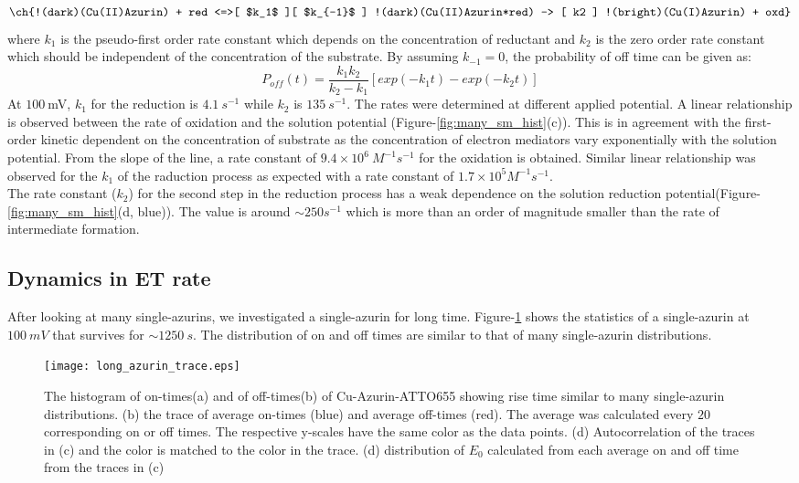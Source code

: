 \begin{align}
	\ch{!(dark)(Cu(II)Azurin) + red <=>[ $k_1$ ][ $k_{-1}$ ] !(dark)(Cu(II)Azurin*red) -> [ k2 ] !(bright)(Cu(I)Azurin) + oxd}
	\label{eq:reduction}
\end{align}
where $k_1$ is the pseudo-first order rate constant which depends on the concentration of reductant and $k_2$ is the zero order rate constant which should be independent of the concentration of the substrate. By assuming $k_{-1}=0$, the probability of off time can be given as:\cite{lu1998single-molecule}
\begin{equation}
	P_{off}(t) = \frac{k_1k_2}{k_2-k_1} [exp(-k_1t)-exp(-k_2t)]
	\label{eq:2exp_risetime}
\end{equation}
At $100~$mV, $k_1$ for the reduction is $4.1~s^{-1}$ while $k_2$ is $135~s^{-1}$. The rates were determined at different applied potential. A linear relationship is observed between the rate of oxidation and the solution potential (Figure-\ref{fig:many_sm_hist}(c)). This is in agreement with the first-order kinetic dependent on the concentration of substrate as the concentration of electron mediators vary exponentially with the solution potential. From the slope of the line, a rate constant of $9.4\times10^6~M^{-1}s^{-1}$ for the oxidation is obtained. Similar linear relationship was observed for the $k_1$ of the raduction process as expected with a rate constant of $1.7\times10^5M^{-1}s^{-1}$.\\
The rate constant ($k_2$) for the second step in the reduction process has a weak dependence on the solution reduction potential(Figure-\ref{fig:many_sm_hist}(d, blue)). The value is around ${\sim}250s^{-1}$ which is more than an order of magnitude smaller than the rate of intermediate formation.\\
\subsection{Dynamics in ET rate}
After looking at many single-azurins, we investigated a single-azurin for long time. Figure-\ref{fig:long_azurin_trace} shows the statistics of a single-azurin at $100~mV$ that survives for ${\sim}1250~s$. The distribution of on and off times are similar to that of many single-azurin distributions.
\begin{figure}
	\centering
	\texttt{[image: long\_azurin\_trace.eps]}
	\caption{The histogram of on-times(a) and of off-times(b) of Cu-Azurin-ATTO655 showing rise time similar to many single-azurin distributions. (b) the trace of average on-times (blue) and average off-times (red). The average was calculated every $20$ corresponding on or off times. The respective y-scales have the same color as the data points. (d) Autocorrelation of the traces in (c) and the color is matched to the color in the trace. (d) distribution of $E_0$ calculated from each average on and off time from the traces in (c)}
	\label{fig:long_azurin_trace}
\end{figure}

